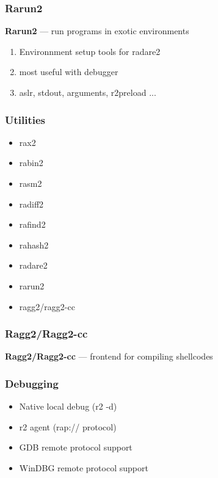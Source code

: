 \documentclass[10pt, compress]{beamer}
\begin{document}
\begin{frame}[fragile]
  \frametitle{Rarun2}
  \center\textbf{Rarun2} — run programs in exotic environments
  \noindent\makebox[\linewidth]{\rule{\paperwidth}{0.4pt}}
  \begin{enumerate}
  \item Environnment setup tools for radare2
  \item most useful with debugger
  \item aslr, stdout, arguments, r2preload ...
 \end{enumerate}
\end{frame}

\begin{frame}[fragile]
  \frametitle{Utilities}
     \begin{itemize}
        \item rax2
        \item rabin2
        \item rasm2
        \item radiff2
        \item rafind2
        \item rahash2
        \item radare2
        \item rarun2
        \item \alert{ragg2/ragg2-cc}
      \end{itemize}
\end{frame}

\begin{frame}[fragile]
  \frametitle{Ragg2/Ragg2-cc}
  \center\textbf{Ragg2/Ragg2-cc} — frontend for compiling shellcodes
  \noindent\makebox[\linewidth]{\rule{\paperwidth}{0.4pt}}
\end{frame}

\begin{frame}[fragile]
  \frametitle{Debugging}
  \begin{itemize}
	\item Native local debug (r2 -d)
	\item r2 agent (rap:// protocol)
	\item GDB remote protocol support
	\item WinDBG remote protocol support
  \end{itemize}
\end{frame}
\end{document}
